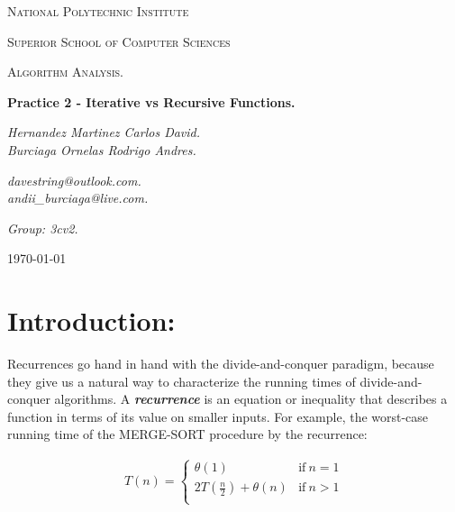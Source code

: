 \documentclass[10pt,a4paper]{article}
\begin{document}
\begin{titlepage}
	\centering
	{ \huge \scshape National Polytechnic Institute\par}
	{ \Large \scshape  Superior School of Computer Sciences\par }
	\vspace{1cm}
	{\scshape\Large Algorithm Analysis.\par}
	\vspace{1.5cm}
	{\huge\bfseries Practice 2 - Iterative vs Recursive Functions.\par}
	\vspace{2cm}
	{\Large\itshape Hernandez Martinez Carlos David. \\ Burciaga Ornelas Rodrigo Andres.\par} \hfill \break
	{\Large\itshape davestring@outlook.com. \\ andii\_burciaga@live.com.\par} \hfill \break
	{\Large\itshape Group: 3cv2. \par}
	\vfill
	{\large \today\par} 
	\vfill
\end{titlepage}

\renewcommand\lstlistingname{Quelltext} 



\tableofcontents 
{}
\pagebreak

\section{Introduction:}

Recurrences go hand in hand with the divide-and-conquer paradigm, because they
give us a natural way to characterize the running times of divide-and-conquer algorithms. A {\bfseries\itshape recurrence} is an equation or inequality that describes a function in terms of its value on smaller inputs. For example,  the worst-case running time  of the MERGE-SORT procedure by the recurrence: 

\begin{ceqn}
\begin{align}
T( n ) = \left\{
\begin{array}{ll}
\theta ( 1 ) & \mathrm {if\ } n = 1 \\
2T(\frac{n}{2}) + \theta ( n ) & \mathrm {if\ } n > 1 \\
\end{array}
\right.
\end{align}
\end{ceqn} 
\end{document}
